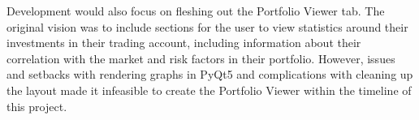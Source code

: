 \documentclass{article}
\begin{document}
\indent Development would also focus on fleshing out the Portfolio Viewer tab. The original vision was to include sections for the user to view statistics around their investments in their trading account, including information about their correlation with the market and risk factors in their portfolio. However, issues and setbacks with rendering graphs in PyQt5 and complications with cleaning up the layout made it infeasible to create the Portfolio Viewer within the timeline of this project.  

\printbibliography




\end{document}
